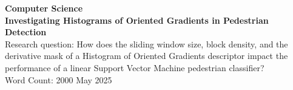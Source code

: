 \documentclass[a4paper, 12pt]{article}
\begin{document}

\begin{titlepage}
    \begin{center}
        \vspace*{1cm}
        \large{\textbf{Computer Science}}\\
        \vspace{3cm}
        \Large{\textbf{Investigating Histograms of Oriented Gradients in Pedestrian Detection}}\\
        \vspace{1.5cm}
        \large{Research question: How does the sliding window size, block density, and the derivative mask of a Histogram of Oriented Gradients descriptor impact the performance of a linear Support Vector Machine pedestrian classifier?}\\
        \vspace{3cm}
        \large{Word Count: 2000}
        \vfill
        \large{May 2025}
    \end{center}
\end{titlepage}




\begin{center}
\begin{spacing}{0.1}
\tableofcontents
\end{spacing}

\vspace{1in}
\end{center}
\newpage
{}
% 

% 









\newpage
\printbibliography[
heading=bibintoc,
]
\newpage

\end{document}
